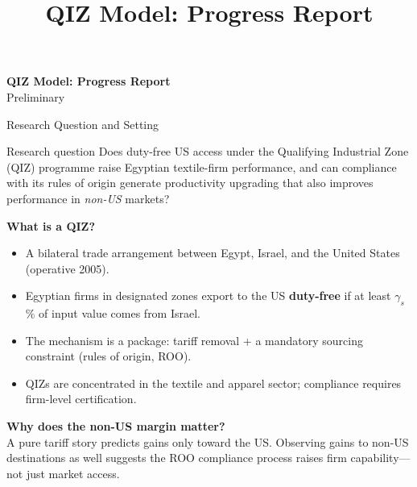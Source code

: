 \documentclass[aspectratio=169,10pt]{beamer}
\title[QIZ Model Progress]{QIZ Model: Progress Report}
\author{}
\date{}
\begin{document}
\begin{frame}[plain]
  \vfill
  \centering
  {\color{titleblue}\Large\bfseries QIZ Model: Progress Report}\\[10pt]
  {\normalsize Preliminary}
  \vfill
\end{frame}

\begin{frame}{Research Question and Setting}
\begin{block}{Research question}
Does duty-free US access under the Qualifying Industrial Zone (QIZ) programme raise Egyptian textile-firm performance, and can compliance with its rules of origin generate productivity upgrading that also improves performance in \emph{non-US} markets?
\end{block}

\vspace{0.7em}
\textbf{What is a QIZ?}
\begin{itemize}
  \item A bilateral trade arrangement between Egypt, Israel, and the United States (operative 2005).
  \item Egyptian firms in designated zones export to the US \textbf{duty-free} if at least $\gamma_s$\% of input value comes from Israel.
  \item The mechanism is a package: tariff removal + a mandatory sourcing constraint (rules of origin, ROO).
  \item QIZs are concentrated in the textile and apparel sector; compliance requires firm-level certification.
\end{itemize}

\vspace{0.5em}
\textbf{Why does the non-US margin matter?}\\
A pure tariff story predicts gains only toward the US. Observing gains to non-US destinations as well suggests the ROO compliance process raises firm capability---not just market access.
\end{frame}
\end{document}
